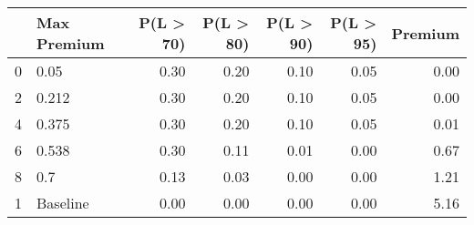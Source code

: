 \begin{tabular}{llrrrrr}
\toprule
{} & Max Premium &  P(L > 70) &  P(L > 80) &  P(L > 90) &  P(L > 95) &  Premium \\
\midrule
0 &        0.05 &       0.30 &       0.20 &       0.10 &       0.05 &     0.00 \\
2 &       0.212 &       0.30 &       0.20 &       0.10 &       0.05 &     0.00 \\
4 &       0.375 &       0.30 &       0.20 &       0.10 &       0.05 &     0.01 \\
6 &       0.538 &       0.30 &       0.11 &       0.01 &       0.00 &     0.67 \\
8 &         0.7 &       0.13 &       0.03 &       0.00 &       0.00 &     1.21 \\
1 &    Baseline &       0.00 &       0.00 &       0.00 &       0.00 &     5.16 \\
\bottomrule
\end{tabular}
